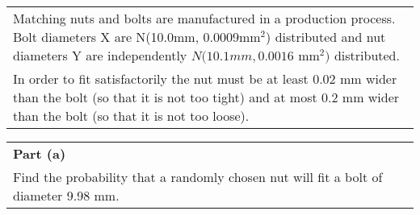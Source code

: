 \documentclass[a4paper,12pt]{article}
\begin{document}
\large
\begin{table}[ht!]
     \centering
     \begin{tabular}{|p{15cm}|}
     \hline        \large
Matching nuts and bolts are manufactured in a production process.  Bolt diameters X are N(10.0mm, 0.0009mm$^2$) distributed and nut diameters Y are independently $N(10.1mm, 0.0016$ mm$^2)$ distributed. \\ \medskip

In order to fit  satisfactorily the nut must be at least
0.02 mm wider than the bolt (so that it is not too tight) and at most 0.2 mm wider than
the bolt (so that it is not too loose).
\\ \hline
      \end{tabular}
    \end{table}
    
    
\begin{table}[ht!]
     \centering
     \begin{tabular}{|p{15cm}|}
     \hline        \large
    \noindent \textbf{Part (a)}\\
Find the probability that a randomly chosen nut will fit a bolt of diameter 9.98 mm.\smallskip \\  \hline
      \end{tabular}
    \end{table}
    
\end{document}
